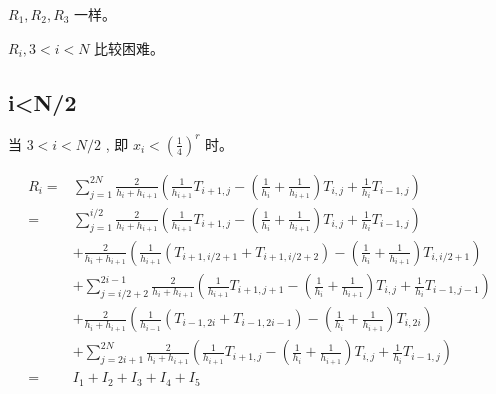 \documentclass{ctexart}
\theoremstyle{definition}
\theoremstyle{remark}
\numberwithin{equation}{section}
\begin{document}
\(R_1, R_2, R_3\) 一样。





\newpage

\(R_i, 3<i< N\) 比较困难。





\subsection{i<N/2}

当 \(3<i<N/2\) , 即 \(x_i<(\frac{1}{4})^r\) 时。


\begin{equation}
    \begin{aligned}
        R_i
        = & \sum_{j=1}^{2N} \frac{2}{h_i + h_{i+1}}
        \left( \frac{1}{h_{i+1}} T_{i+1, j}
        - (\frac{1}{h_{i}}+\frac{1}{h_{i+1}}) T_{i,j}
        +  \frac{1}{h_{i}} T_{i-1, j} \right)                     \\
        = & \sum_{j=1}^{i/2} \frac{2}{h_i + h_{i+1}}
        \left( \frac{1}{h_{i+1}} T_{i+1, j}
        - (\frac{1}{h_{i}}+\frac{1}{h_{i+1}}) T_{i,j}
        +  \frac{1}{h_{i}} T_{i-1, j} \right)                     \\
          & + \frac{2}{h_i + h_{i+1}}
        \left( \frac{1}{h_{i+1}} (T_{i+1, i/2+1} +  T_{i+1, i/2+2})
        - (\frac{1}{h_{i}}+\frac{1}{h_{i+1}}) T_{i,i/2+1} \right) \\
          & + \sum_{j=i/2+2}^{2i-1} \frac{2}{h_i + h_{i+1}}
        \left( \frac{1}{h_{i+1}} T_{i+1, j+1}
        - (\frac{1}{h_{i}}+\frac{1}{h_{i+1}}) T_{i,j}
        +  \frac{1}{h_{i}} T_{i-1, j-1} \right)                   \\
          & + \frac{2}{h_i + h_{i+1}}
        \left( \frac{1}{h_{i-1}} (T_{i-1, 2i} +  T_{i-1, 2i-1})
        - (\frac{1}{h_{i}}+\frac{1}{h_{i+1}}) T_{i,2i} \right)    \\
          & + \sum_{j=2i+1}^{2N} \frac{2}{h_i + h_{i+1}}
        \left( \frac{1}{h_{i+1}} T_{i+1, j}
        - (\frac{1}{h_{i}}+\frac{1}{h_{i+1}}) T_{i,j}
        +  \frac{1}{h_{i}} T_{i-1, j} \right)                     \\
        = & I_1 + I_2 + I_3 + I_4 + I_5
    \end{aligned}
\end{equation}
\end{document}
